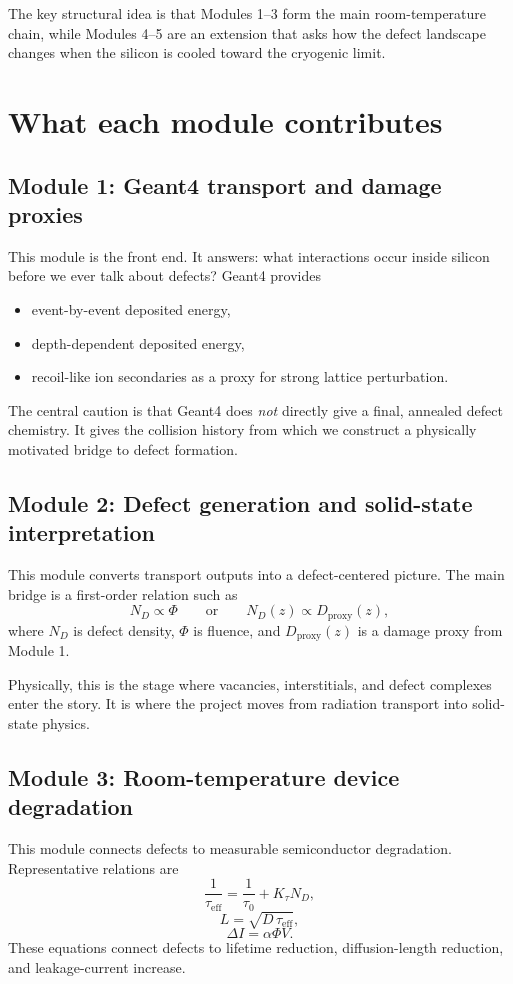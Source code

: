 \documentclass[11pt]{article}
\newcommand{\taueff}{\tau_\mathrm{eff}}
\begin{document}
The key structural idea is that Modules 1--3 form the main room-temperature chain, while Modules 4--5 are an extension that asks how the defect landscape changes when the silicon is cooled toward the cryogenic limit.

\section{What each module contributes}
\subsection{Module 1: Geant4 transport and damage proxies}
This module is the front end. It answers: what interactions occur inside silicon before we ever talk about defects? Geant4 provides
\begin{itemize}
    \item event-by-event deposited energy,
    \item depth-dependent deposited energy,
    \item recoil-like ion secondaries as a proxy for strong lattice perturbation.
\end{itemize}

The central caution is that Geant4 does \emph{not} directly give a final, annealed defect chemistry. It gives the collision history from which we construct a physically motivated bridge to defect formation.

\subsection{Module 2: Defect generation and solid-state interpretation}
This module converts transport outputs into a defect-centered picture. The main bridge is a first-order relation such as
\begin{equation}
N_D \propto \Phi
\qquad \text{or} \qquad
N_D(z) \propto D_{\mathrm{proxy}}(z),
\end{equation}
where $N_D$ is defect density, $\Phi$ is fluence, and $D_{\mathrm{proxy}}(z)$ is a damage proxy from Module 1.

Physically, this is the stage where vacancies, interstitials, and defect complexes enter the story. It is where the project moves from radiation transport into solid-state physics.

\subsection{Module 3: Room-temperature device degradation}
This module connects defects to measurable semiconductor degradation. Representative relations are
\begin{equation}
\frac{1}{\taueff} = \frac{1}{\tau_0} + K_\tau N_D,
\end{equation}
\begin{equation}
L = \sqrt{D\,\taueff},
\end{equation}
\begin{equation}
\Delta I = \alpha \Phi V.
\end{equation}
These equations connect defects to lifetime reduction, diffusion-length reduction, and leakage-current increase.
\end{document}
